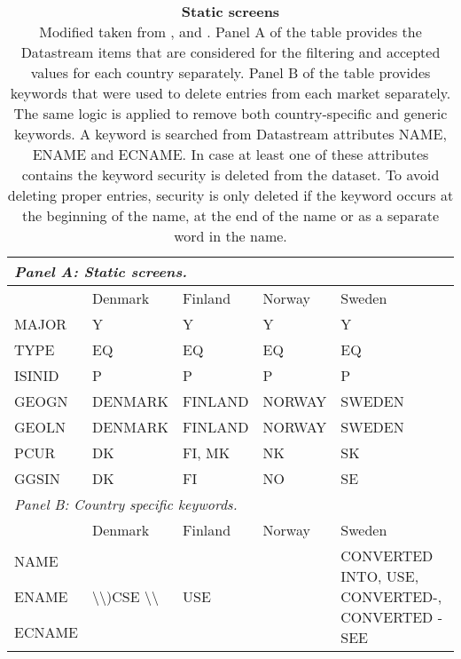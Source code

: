 \documentclass[12pt]{article}
\begin{document}
\begin{appendices}
\begin{table}[H]
\footnotesize
\caption[Static screens]{\textbf{Static screens}\\ Modified taken from \protect\citet{Ince2006}, \protect\citet{HANAUER2023106712} and \protect\citet{HANAUER2023}. Panel A of the table provides the Datastream items that are considered for the filtering and accepted values for each country separately. Panel B of the table provides keywords that were used to delete entries from each market separately. The same logic is applied to remove both country-specific and generic keywords. A keyword is searched from Datastream attributes NAME, ENAME and ECNAME. In case at least one of these attributes contains the keyword security is deleted from the dataset. To avoid deleting proper entries, security is only deleted if the keyword occurs at the beginning of the name, at the end of the name or as a separate word in the name.\footnotemark}
\label{table:StaticScreens}
\begin{tabularx}{\textwidth}{X X X X l}
\toprule
\multicolumn{5}{l}{\textit{Panel A: Static screens.}} \\
\midrule
 & Denmark & Finland & Norway & Sweden\\
\midrule
MAJOR & Y & Y & Y & Y\\
TYPE & EQ & EQ & EQ & EQ\\
ISINID & P & P & P & P\\
GEOGN & DENMARK & FINLAND & NORWAY & SWEDEN\\
GEOLN & DENMARK & FINLAND & NORWAY & SWEDEN\\
PCUR & DK & FI, MK & NK & SK\\
GGSIN & DK & FI & NO &SE\\
\toprule
\multicolumn{5}{l}{\textit{Panel B: Country specific keywords.}} \\
\midrule
 & Denmark & Finland & Norway & Sweden\\
 \midrule
NAME & \multirow[m]{3}{*}{ \textbackslash \textbackslash)CSE \textbackslash \textbackslash} & \multirow[m]{3}{*}{USE} & & \multirow[m]{3}{13em}{CONVERTED INTO, USE, CONVERTED-, CONVERTED - SEE}\\
ENAME & & \\
ECNAME & &\\
\bottomrule
\end{tabularx}
\end{table}


\end{appendices}
\end{document}

